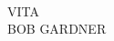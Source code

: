 \documentclass[12pt]{etsu_thesis}
\begin{document}







\newpage
{}

\newpage

\ \ \ \ \

\thispagestyle{plain}

\vspace{-.4in}

\begin{center}
VITA\\ BOB GARDNER
\end{center}

\vspace{.4in}
\end{document}
